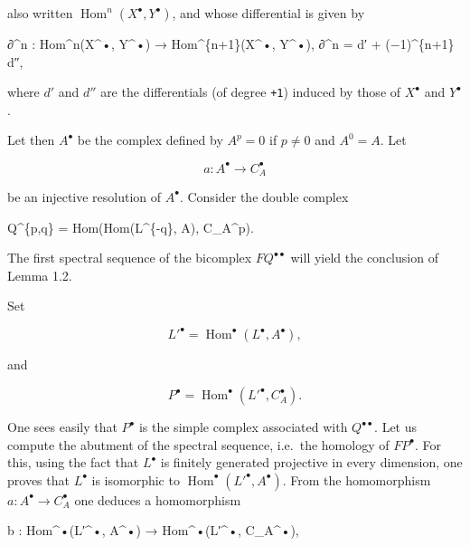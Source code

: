 \documentclass[
]{article}
\newenvironment{Shaded}{}{}
\newcommand{\NormalTok}[1]{#1}
\begin{document}
also written \(\operatorname{Hom}^{n}(X^{\bullet}, Y^{\bullet})\), and
whose differential is given by

\begin{Shaded}
\begin{Highlighting}[]
\NormalTok{∂\^{}n : Hom\^{}n(X\^{}•, Y\^{}•) → Hom\^{}\{n+1\}(X\^{}•, Y\^{}•),}
\NormalTok{∂\^{}n = d′ + (−1)\^{}\{n+1\} d″,}
\end{Highlighting}
\end{Shaded}

where \(d'\) and \(d''\) are the differentials (of degree \texttt{+1})
induced by those of \(X^{\bullet}\) and \(Y^{\bullet}\).

Let then \(A^{\bullet}\) be the complex defined by \(A^{p} = 0\) if
\(p \neq 0\) and \(A^{0} = A\). Let

\[
a : A^{\bullet} \to C^{\bullet}_{A}
\]

be an injective resolution of \(A^{\bullet}\). Consider the double
complex

\begin{Shaded}
\begin{Highlighting}[]
\NormalTok{Q\^{}\{p,q\} = Hom(Hom(L\^{}\{{-}q\}, A), C\_A\^{}p).}
\end{Highlighting}
\end{Shaded}

The first spectral sequence of the bicomplex \(F Q^{\bullet\bullet}\)
will yield the conclusion of Lemma 1.2.

Set

\[
L'^{\bullet} = \operatorname{Hom}^{\bullet}(L^{\bullet}, A^{\bullet}),
\]

and

\[
P^{\bullet} = \operatorname{Hom}^{\bullet}(L'^{\bullet}, C^{\bullet}_{A}).
\]

One sees easily that \(P^{\bullet}\) is the simple complex associated
with \(Q^{\bullet\bullet}\). Let us compute the abutment of the spectral
sequence, i.e.~the homology of \(F P^{\bullet}\). For this, using the
fact that \(L^{\bullet}\) is finitely generated projective in every
dimension, one proves that \(L^{\bullet}\) is isomorphic to
\(\operatorname{Hom}^{\bullet}(L'^{\bullet}, A^{\bullet})\). From the
homomorphism \(a : A^{\bullet} \to C^{\bullet}_{A}\) one deduces a
homomorphism

\begin{Shaded}
\begin{Highlighting}[]
\NormalTok{b : Hom\^{}•(L′\^{}•, A\^{}•) → Hom\^{}•(L′\^{}•, C\_A\^{}•),}
\end{Highlighting}
\end{Shaded}
\end{document}
